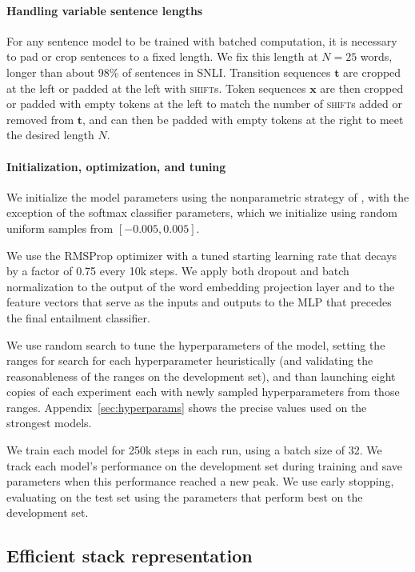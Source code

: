 \documentclass[11pt]{article}
\newcommand{\shift}{\textsc{shift}}
\begin{document}
\paragraph{Handling variable sentence lengths} For any sentence model to be trained with batched computation, it is necessary to pad or crop sentences to a fixed length. We fix this length at $N = 25$ words, longer than about 98\% of sentences in SNLI. Transition sequences $\mathbf t$ are cropped at the left or padded at the left with \shift s. Token sequences $\mathbf x$ are then cropped or padded with empty tokens at the left to match the number of \shift s added or removed from $\mathbf t$, and can then be padded with empty tokens at the right to meet the desired length $N$.

\paragraph{Initialization, optimization, and tuning}

We initialize the model parameters using the nonparametric strategy of \citet{DBLP:journals/corr/HeZR015}, with the exception of the softmax classifier parameters, which we initialize using random uniform samples from $[-0.005, 0.005]$.

We use the RMSProp optimizer \citep{tieleman2012lecture} with a tuned starting learning rate that decays by a factor of 0.75 every 10k steps. We apply both dropout \citep{srivastava2014dropout} and batch normalization \citep{2015SIoffeCSzegedy} to the output of the word embedding projection layer and to the feature vectors that serve as the inputs and outputs to the MLP that precedes the final entailment classifier.

We use random search to tune the hyperparameters of the model, setting the ranges for search for each hyperparameter heuristically (and validating the reasonableness of the ranges on the development set), and than launching eight copies of each experiment each with newly sampled hyperparameters from those ranges. Appendix~\ref{sec:hyperparams} shows the precise values used on the strongest models.

We train each model for 250k steps in each run, using a batch size of 32. We track each model's performance on the development set during training and save parameters when this performance reached a new peak. We use early stopping, evaluating on the test set using the parameters that perform best on the development set.

\subsection{Efficient stack representation}
\end{document}
